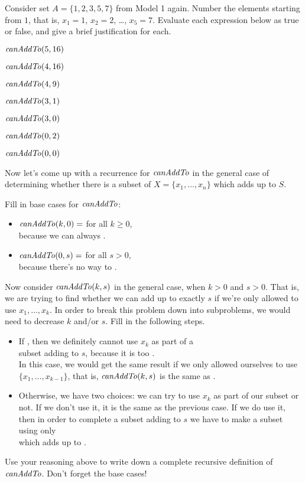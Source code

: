 \documentclass{tufte-handout}
\begin{document}
\begin{questions}
\item Consider set $A = \{1,2,3,5,7\}$ from Model 1 again.  Number the
  elements starting from $1$, that is, $x_1 = 1$, $x_2 = 2$, \dots,
  $x_5 = 7$.  Evaluate each expression below as true or false,
  and give a brief justification for each.
  \begin{subquestions}
  \item $\mathit{canAddTo}(5, 16)$
  \item $\mathit{canAddTo}(4, 16)$
  \item $\mathit{canAddTo}(4, 9)$
  \item $\mathit{canAddTo}(3, 1)$
  \item $\mathit{canAddTo}(3, 0)$
  \item $\mathit{canAddTo}(0, 2)$
  \item $\mathit{canAddTo}(0, 0)$
  \end{subquestions}
\end{questions}
Now let's come up with a recurrence for $\mathit{canAddTo}$ in the general
case of determining whether there is a subset of $X = \{x_1, \dots,
x_n\}$ which adds up to $S$.
\begin{questions}
  \item Fill in base cases for $\mathit{canAddTo}$:
    \begin{itemize}
    \item $\mathit{canAddTo}(k,0) = $ \blank for all $k \geq 0$, \\ because we
      can always
      \blank.
    \item $\mathit{canAddTo}(0,s) = $ \blank for all $s > 0$, \\ because
      there's no way to \blank.
    \end{itemize}
  \item Now consider $\mathit{canAddTo}(k,s)$ in the general case, when
    $k > 0$ and $s > 0$.  That is, we are trying to find whether we
    can add up to exactly $s$ if we're only allowed to use
    $x_1, \dots, x_k$.  In order to break this problem down into
    subproblems, we would need to decrease $k$ and/or $s$.  Fill in
    the following steps.
    \begin{itemize}
    \item If \blank, then we definitely cannot use $x_k$ as part of a \\
      subset adding to $s$, because it is too \blank.  \\ In this
      case, we would get the same result if we only allowed ourselves
      to use $\{x_1, \dots, x_{k-1}\}$, that is, $\mathit{canAddTo}(k,s)$ is the
      same as \blank.
    \item Otherwise, we have two choices: we can try to use $x_k$ as
      part of our subset or not.  If we don't use it, it is the same
      as the previous case.  If we do use it, then in order to
      complete a subset adding to $s$ we have to make a subset using
      only \blank \\ which adds up to \blank.
    \end{itemize}
  \item Use your reasoning above to write down a complete recursive
    definition of $\mathit{canAddTo}$.  Don't forget the base cases!
\end{questions}
\end{document}
